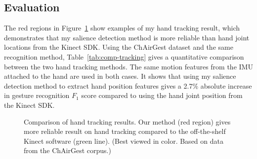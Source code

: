 \subsection{Evaluation}
The red regions in Figure~\ref{fig:compare-skeleton} show examples of my hand
tracking result, which demonstrates
that my salience detection method is more reliable than hand joint
locations from the Kinect SDK. Using the
ChAirGest dataset and the same recognition method, Table~\ref{tab:comp-tracking}
gives a quantitative comparison between the two hand tracking methods. The same
motion features from the IMU attached to the hand are used in both cases. It shows that using my salience detection method to extract hand position features
gives a 2.7\% absolute increase in gesture recognition $F_1$ score compared to
using the hand joint position from the Kinect SDK.

\begin{figure}
\centering
{}
\caption{Comparison of hand tracking results. Our method (red region) gives more
reliable result on hand tracking compared to the off-the-shelf Kinect software
(green line). (Best viewed in color. Based on data from the ChAirGest
corpus.)}
\label{fig:compare-skeleton}
\end{figure}

